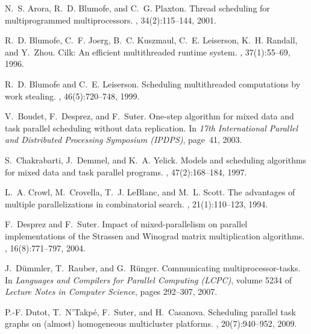 \documentclass[preprint]{sigplanconf}
\begin{document}
\begin{thebibliography}{10}

N.~S. Arora, R.~D. Blumofe, and C.~G. Plaxton.
\newblock Thread scheduling for multiprogrammed multiprocessors.
, 34(2):115--144, 2001.

R.~D. Blumofe, C.~F. Joerg, B.~C. Kuszmaul, C.~E. Leiserson, K.~H. Randall, and
  Y.~Zhou.
\newblock Cilk: An efficient multithreaded runtime system.
,
  37(1):55--69, 1996.

R.~D. Blumofe and C.~E. Leiserson.
\newblock Scheduling multithreaded computations by work stealing.
, 46(5):720--748, 1999.

V.~Boudet, F.~Desprez, and F.~Suter.
\newblock One-step algorithm for mixed data and task parallel scheduling
  without data replication.
\newblock In {\em 17th International Parallel and Distributed Processing
  Symposium ({IPDPS})}, page~41, 2003.

S.~Chakrabarti, J.~Demmel, and K.~A. Yelick.
\newblock Models and scheduling algorithms for mixed data and task parallel
  programs.
,
  47(2):168--184, 1997.

L.~A. Crowl, M.~Crovella, T.~J. LeBlanc, and M.~L. Scott.
\newblock The advantages of multiple parallelizations in combinatorial search.
,
  21(1):110--123, 1994.

F.~Desprez and F.~Suter.
\newblock Impact of mixed-parallelism on parallel implementations of the
  {Strassen} and {Winograd} matrix multiplication algorithms.
, 16(8):771--797, 2004.

J.~D{\"u}mmler, T.~Rauber, and G.~R{\"u}nger.
\newblock Communicating multiprocessor-tasks.
\newblock In {\em Languages and Compilers for Parallel Computing ({LCPC})},
  volume 5234 of {\em {L}ecture {N}otes in {C}omputer {S}cience}, pages
  292--307, 2007.

P.-F. Dutot, T.~N'Takp{\'e}, F.~Suter, and H.~Casanova.
\newblock Scheduling parallel task graphs on (almost) homogeneous multicluster
  platforms.
,
  20(7):940--952, 2009.


\end{thebibliography}
\end{document}
